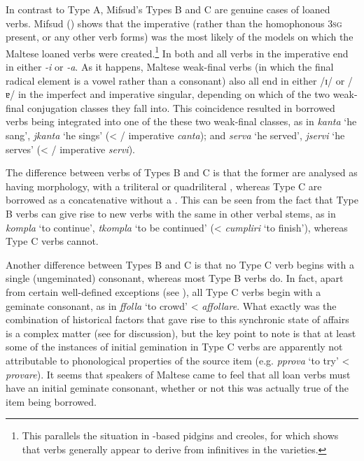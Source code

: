 \documentclass[output=paper]{langsci/langscibook}
\begin{document}
In contrast to Type A, Mifsud's Types B and C are genuine cases of loaned verbs. Mifsud (\citeyear[110--116]{mifsudloanverbs}) shows that the imperative (rather than the homophonous 3\textsc{sg} present, or any other verb forms) was the most likely  of the  models on which the Maltese loaned verbs were created.\footnote{This parallels the situation in -based pidgins and creoles, for which \cite{Versteegh2014pidgin} shows that verbs generally appear to derive from infinitives in the  varieties.} In both  and  all verbs in the imperative end in either \textit{-i} or \textit{-a}. As it happens, Maltese weak-final verbs (in which the final radical element is a vowel rather than a consonant) also all end in either /ɪ/ or /ɐ/ in the imperfect and imperative singular, depending on which of the two weak-final conjugation classes they fall into. This coincidence resulted in borrowed  verbs being integrated into one of the these two weak-final classes, as in \textit{kanta} `he sang', \textit{jkanta} `he sings' (< / imperative \textit{canta}); and \textit{serva} `he served', \textit{jservi} `he serves' (< / imperative \textit{servi}).

The difference between verbs of Types B and C is that the former are analysed as having  morphology, with a triliteral or quadriliteral , whereas Type C are borrowed as a concatenative  without a . This can be seen from the fact that Type B verbs can give rise to new verbs with the same  in other verbal stems, as in \textit{kompla} `to continue', \textit{tkompla} `to be continued' (<  \textit{cumpliri} `to finish'), whereas Type C verbs cannot.

Another difference between Types B and C is that no Type C verb begins with a single (ungeminated) consonant, whereas most Type B verbs do. In fact, apart from certain well-defined exceptions (see \citealt[152]{mifsudloanverbs}), all Type C verbs begin with a geminate consonant, as in \textit{ffolla} `to crowd' <  \textit{affollare}. What exactly was the combination of historical factors that gave rise to this synchronic state of affairs is a complex matter (see \citealt[158--168]{mifsudloanverbs} for discussion), but the key point to note is that at least some of the instances of initial gemination in Type C verbs are apparently not attributable to phonological properties of the source item (e.g. \textit{pprova} `to try' <  \textit{provare}). It seems that speakers of Maltese came to feel that all loan verbs must have an initial geminate consonant, whether or not this was actually true of the item being borrowed.
\end{document}
